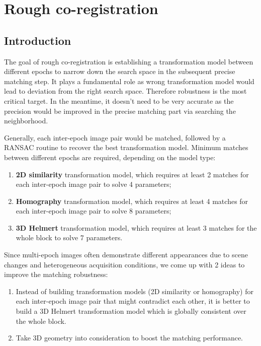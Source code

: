 
\chapter{Rough co-registration}
\label{chap:intro}
\minitoc

\section{Introduction}
The goal of rough co-registration is establishing a transformation model between different epochs to narrow down the search space in the subsequent precise matching step. It plays a fundamental role as wrong transformation model would lead to deviation from the right search space. Therefore robustness is the most critical target. In the meantime, it doesn't need to be very accurate as the precision would be improved in the precise matching part via searching the neighborhood.
\par
Generally, each inter-epoch image pair would be matched, followed by a RANSAC routine to recover the best transformation model.
Minimum matches between different epochs are required, depending on the model type:\\
\begin{enumerate}
    \item \textbf{2D similarity }transformation model, which requires at least 2 matches for each inter-epoch image pair to solve 4 parameters;
    \item \textbf{Homography }transformation model, which requires at least 4 matches for each inter-epoch image pair to solve 8 parameters;
    \item \textbf{3D Helmert }transformation model, which requires at least 3 matches for the whole block to solve 7 parameters.
\end{enumerate}
%
Since multi-epoch images often demonstrate different appearances due to scene changes and heterogeneous acquisition conditions, we come up with 2 ideas to improve the matching robustness:\\
\begin{enumerate}
    \item Instead of building transformation models (2D similarity or homography) for each inter-epoch image pair that might contradict each other, it is better to build a 3D Helmert transformation model which is globally consistent over the whole block.
    \item Take 3D geometry into consideration to boost the matching performance.
\end{enumerate}
